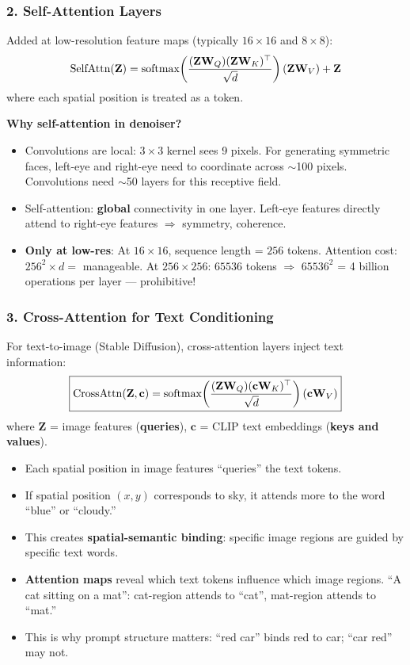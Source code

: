 \subsubsection{2. Self-Attention Layers}
Added at low-resolution feature maps (typically $16{\times}16$ and $8{\times}8$):
$$\text{SelfAttn}(\mathbf{Z}) = \text{softmax}\!\left(\frac{(\mathbf{Z}\mathbf{W}_Q)(\mathbf{Z}\mathbf{W}_K)^\top}{\sqrt{d}}\right)(\mathbf{Z}\mathbf{W}_V) + \mathbf{Z}$$
where each spatial position is treated as a token.

\textbf{Why self-attention in denoiser?}
\begin{itemize}
\item Convolutions are local: $3{\times}3$ kernel sees 9 pixels. For generating symmetric faces, left-eye and right-eye need to coordinate across $\sim$100 pixels. Convolutions need $\sim$50 layers for this receptive field.
\item Self-attention: \textbf{global} connectivity in one layer. Left-eye features directly attend to right-eye features $\Rightarrow$ symmetry, coherence.
\item \textbf{Only at low-res}: At $16{\times}16$, sequence length = $256$ tokens. Attention cost: $256^2 \times d = $ manageable. At $256{\times}256$: $65536$ tokens $\Rightarrow$ $65536^2$ = 4 billion operations per layer — prohibitive!
\end{itemize}

\subsubsection{3. Cross-Attention for Text Conditioning}
For text-to-image (Stable Diffusion), cross-attention layers inject text information:
\begin{equation}
\boxed{\text{CrossAttn}(\mathbf{Z}, \mathbf{c}) = \text{softmax}\!\left(\frac{(\mathbf{Z}\mathbf{W}_Q)(\mathbf{c}\mathbf{W}_K)^\top}{\sqrt{d}}\right)(\mathbf{c}\mathbf{W}_V)}
\end{equation}
where $\mathbf{Z}$ = image features (\textbf{queries}), $\mathbf{c}$ = CLIP text embeddings (\textbf{keys and values}).

\begin{keybox}
\begin{itemize}
\item Each spatial position in image features ``queries'' the text tokens.
\item If spatial position $(x,y)$ corresponds to sky, it attends more to the word ``blue'' or ``cloudy.''
\item This creates \textbf{spatial-semantic binding}: specific image regions are guided by specific text words.
\item \textbf{Attention maps} reveal which text tokens influence which image regions. ``A cat sitting on a mat'': cat-region attends to ``cat'', mat-region attends to ``mat.'' 
\item This is why prompt structure matters: ``red car'' binds red to car; ``car red'' may not.
\end{itemize}
\end{keybox}

